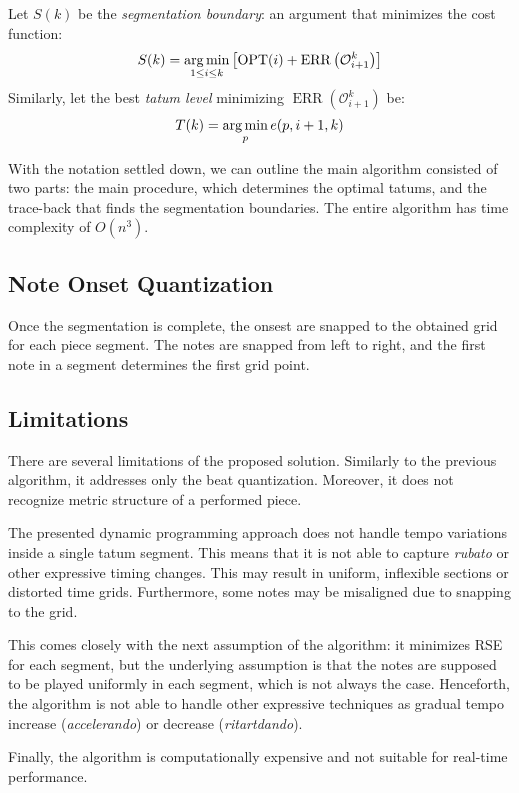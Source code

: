 Let $S(k)$ be the \emph{segmentation boundary}: an argument that minimizes the cost function: \[S(k)=\argmin_{1\leq i \leq k}\left[\operatorname{OPT}(i) + \operatorname{ERR}\left(\mathcal{O}_{i+1}^k\right)\right]\] Similarly, let the best \emph{tatum level} minimizing $\operatorname{ERR}\left(\mathcal{O}_{i+1}^k\right)$ be: \[T(k)=\argmin_{p} e(p,i+1,k)\]

With the notation settled down, we can outline the main algorithm consisted of two parts: the main procedure, which determines the optimal tatums, and the trace-back that finds the segmentation boundaries. The entire algorithm has time complexity of $O\left(n^3\right)$.



\subsection{Note Onset Quantization}

Once the segmentation is complete, the onsest are snapped to the obtained grid for each piece segment. The notes are snapped from left to right, and the first note in a segment determines the first grid point. 

\subsection{Limitations}

There are several limitations of the proposed solution. Similarly to the previous algorithm, it addresses only the beat quantization. Moreover, it does not recognize metric structure of a performed piece.

The presented dynamic programming approach does not handle tempo variations inside a single tatum segment. This means that it is not able to capture \emph{rubato} or other expressive timing changes. This may result in uniform, inflexible sections or distorted time grids. Furthermore, some notes may be misaligned due to snapping to the grid.

This comes closely with the next assumption of the algorithm: it minimizes RSE for each segment, but the underlying assumption is that the notes are supposed to be played uniformly in each segment, which is not always the case. Henceforth, the algorithm is not able to handle other expressive techniques as gradual tempo increase (\emph{accelerando}) or decrease (\emph{ritartdando}).

Finally, the algorithm is computationally expensive and not suitable for real-time performance.
